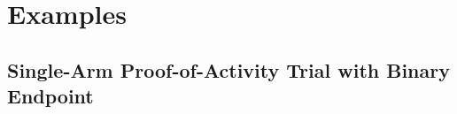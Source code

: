 \documentclass[12pt]{article}
\begin{document}




%


\section{Examples}

\subsection{Single-Arm Proof-of-Activity Trial with Binary Endpoint}
\end{document}
